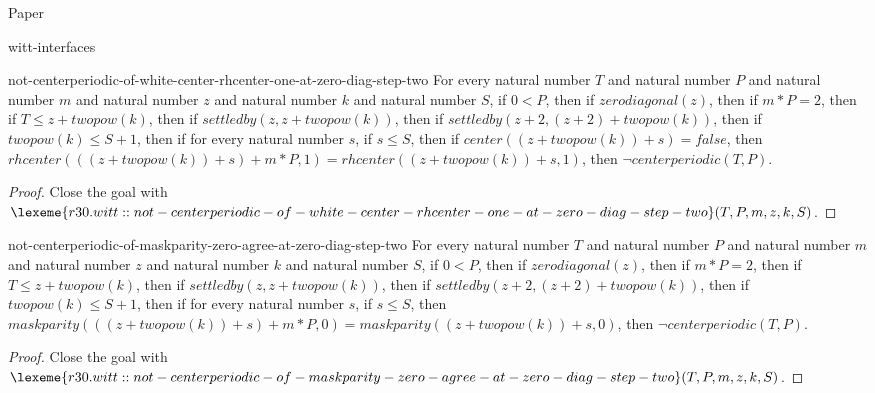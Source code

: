 \begin{lexlean}{Paper}
\begin{section}{witt-interfaces}
  \begin{theorem}{not-centerperiodic-of-white-center-rhcenter-one-at-zero-diag-step-two}
  For every natural number \(T\) and natural number \(P\) and natural number \(m\) and natural number \(z\) and natural number \(k\) and natural number \(S\), if \(0 < P\), then if \(zerodiagonal(z)\), then if \(m * P = 2\), then if \(T ≤ z + twopow(k)\), then if \(settledby(z, z + twopow(k))\), then if \(settledby(z + 2, (z + 2) + twopow(k))\), then if \(twopow(k) ≤ S + 1\), then if for every natural number \(s\), if \(s ≤ S\), then if \(center((z + twopow(k)) + s) = false\), then \(rhcenter(((z + twopow(k)) + s) + m * P, 1) = rhcenter((z + twopow(k)) + s, 1)\), then \(¬ centerperiodic(T, P)\).
  \begin{proof}
  Close the goal with \(\lexeme{r30.witt::not-centerperiodic-of-white-center-rhcenter-one-at-zero-diag-step-two}(T, P, m, z, k, S)\).
  \end{proof}
  \end{theorem}

  \begin{theorem}{not-centerperiodic-of-maskparity-zero-agree-at-zero-diag-step-two}
  For every natural number \(T\) and natural number \(P\) and natural number \(m\) and natural number \(z\) and natural number \(k\) and natural number \(S\), if \(0 < P\), then if \(zerodiagonal(z)\), then if \(m * P = 2\), then if \(T ≤ z + twopow(k)\), then if \(settledby(z, z + twopow(k))\), then if \(settledby(z + 2, (z + 2) + twopow(k))\), then if \(twopow(k) ≤ S + 1\), then if for every natural number \(s\), if \(s ≤ S\), then \(maskparity(((z + twopow(k)) + s) + m * P, 0) = maskparity((z + twopow(k)) + s, 0)\), then \(¬ centerperiodic(T, P)\).
  \begin{proof}
  Close the goal with \(\lexeme{r30.witt::not-centerperiodic-of-maskparity-zero-agree-at-zero-diag-step-two}(T, P, m, z, k, S)\).
  \end{proof}
  \end{theorem}


\end{section}
\end{lexlean}
